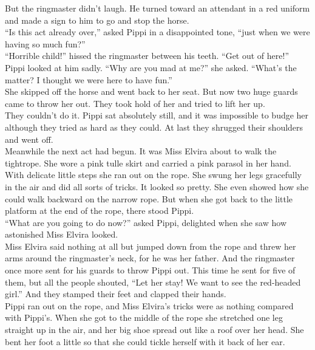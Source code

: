 \documentclass{standard}
\begin{document}
But the ringmaster didn’t laugh. He turned toward an attendant in a red uniform and made a sign to him to go and stop the horse.\\

“Is this act already over,” asked Pippi in a disappointed tone, “just when we were having so much fun?”\\

“Horrible child!” hissed the ringmaster between his teeth. “Get out of here!”\\

Pippi looked at him sadly. “Why are you mad at me?” she asked. “What’s the matter? I thought we were here to have fun.”\\

She skipped off the horse and went back to her seat. But now two huge guards came to throw her out. They took hold of her and tried to lift her up.\\

They couldn’t do it. Pippi sat absolutely still, and it was impossible to budge her although they tried as hard as they could. At last they shrugged their shoulders and went off.\\

Meanwhile the next act had begun. It was Miss Elvira about to walk the tightrope. She wore a pink tulle skirt and carried a pink parasol in her hand. With delicate little steps she ran out on the rope. She swung her legs gracefully in the air and did all sorts of tricks. It looked so pretty. She even showed how she could walk backward on the narrow rope. But when she got back to the little platform at the end of the rope, there stood Pippi.\\

“What are you going to do now?” asked Pippi, delighted when she saw how astonished Miss Elvira looked.\\

Miss Elvira said nothing at all but jumped down from the rope and threw her arms around the ringmaster’s neck, for he was her father. And the ringmaster once more sent for his guards to throw Pippi out. This time he sent for five of them, but all the people shouted, “Let her stay! We want to see the red-headed girl.” And they stamped their feet and clapped their hands.\\

Pippi ran out on the rope, and Miss Elvira’s tricks were as nothing compared with Pippi’s. When she got to the middle of the rope she stretched one leg straight up in the air, and her big shoe spread out like a roof over her head. She bent her foot a little so that she could tickle herself with it back of her ear.\\
\end{document}

